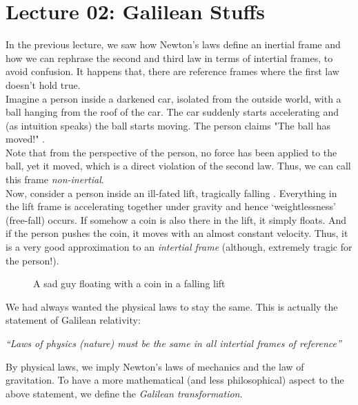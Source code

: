 \section*{Lecture 02: Galilean Stuffs}
In the previous lecture, we saw how Newton's laws define an inertial frame and how we can rephrase the second and third law in terms of intertial frames, to avoid confusion. It happens that, there are reference frames where the first law doesn't hold true. \\[0.2cm]
Imagine a person inside a darkened car, isolated from the outside world, with a ball hanging from the roof of the car. The car suddenly starts accelerating and (as intuition speaks) the ball starts moving. The person claims "The ball has moved!" .\\[0.2cm] Note that from the perspective of the person, no force has been applied to the ball, yet it moved, which is a direct violation of the second law. Thus, we can call this frame \textit{non-inertial}. \\[0.2cm]
Now, consider a person inside an ill-fated lift, tragically falling .  Everything in the lift frame is accelerating together under gravity and hence `weightlessness' (free-fall) occurs. If somehow a coin is also there in the lift, it simply floats. And if the person pushes the coin, it moves with an almost constant velocity. Thus, it is a very good approximation to an \textit{intertial frame} (although, extremely tragic for the person!).
\begin{figure}[H]
    \centering 
    
    \caption{A sad guy floating with a coin in a falling lift }
\end{figure}
\noindent
We had always wanted the physical laws to stay the same. This is actually the statement of Galilean relativity:
\begin{center}
    \itshape
    ``Laws of physics (nature) must be the same in all intertial frames of reference'' 
\end{center}
By physical laws, we imply Newton's laws of mechanics and the law of gravitation. To have a more mathematical (and less philosophical) aspect to the above statement, we define the \textit{Galilean transformation}.
